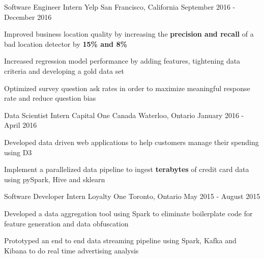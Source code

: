 \begin{cventries}

\cventry
{Software Engineer Intern}
{Yelp}
{San Francisco, California}
{September 2016 - December 2016}
{ %
\begin{cvitems}
\item {Improved business location quality by increasing the \textbf{precision and recall} of a bad location detector by \textbf{15\% and 8\%}}
\item {Increased regression model performance by adding features, tightening data criteria and developing a gold data set}
\item {Optimized survey question ask rates in order to maximize meaningful response rate and reduce question bias}
\end{cvitems}
}


\cventry
{Data Scientist Intern}
{Capital One Canada}
{Waterloo, Ontario}
{January 2016 - April 2016}
{ %
\begin{cvitems}
\item {Developed data driven web applications to help customers manage their spending using D3}
\item {Implement a parallelized data pipeline to ingest \textbf{terabytes} of credit card data using pySpark, Hive and sklearn}
\end{cvitems}
}


\cventry
{Software Developer Intern}
{Loyalty One} %
{Toronto, Ontario} %
{May 2015 - August 2015} %
{
\begin{cvitems}
\item {Developed a data aggregation tool using Spark to eliminate boilerplate code for feature generation and data obfuscation}
\item {Prototyped an end to end data streaming pipeline using Spark, Kafka and Kibana to do real time advertising analysis}
\end{cvitems}
}


\end{cventries}
